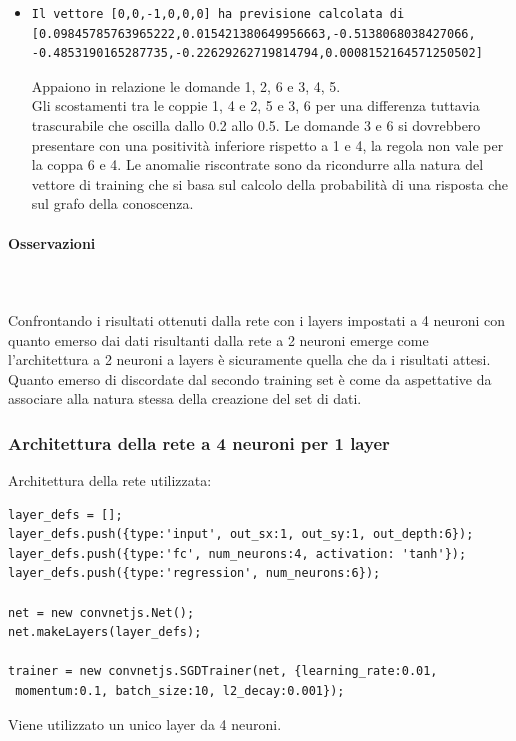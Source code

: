 \begin{itemize}
\item \begin{verbatim}Il vettore [0,0,-1,0,0,0] ha previsione calcolata di
[0.09845785763965222,0.015421380649956663,-0.5138068038427066,
-0.4853190165287735,-0.22629262719814794,0.0008152164571250502]
\end{verbatim}
Appaiono in relazione le domande 1, 2, 6 e 3, 4, 5.\\
Gli scostamenti tra le coppie 1, 4 e 2, 5 e 3, 6 per una differenza tuttavia trascurabile  che oscilla dallo 0.2 allo 0.5.
Le domande 3 e 6 si dovrebbero presentare con una positivit\`a inferiore rispetto a 1 e 4, la regola non vale per la coppa 6 e 4.
Le anomalie riscontrate sono da ricondurre alla natura del vettore di training che si basa sul calcolo della probabilit\`a di una risposta che sul grafo della conoscenza.
\end{itemize}


\paragraph{Osservazioni}\mbox{}
\label{Osservazioni su rete a 2 neuroni per ciascuno dei 2 layers}
\\\\
\noindent
Confrontando i risultati ottenuti dalla rete con i layers impostati a 4 neuroni con quanto emerso dai dati risultanti dalla  rete a 2 neuroni emerge come l'architettura  a 2 neuroni a layers \`e sicuramente quella che da i risultati attesi.\\
Quanto emerso di discordate dal secondo training set \`e come da aspettative da associare alla natura stessa della creazione del set di dati.


\subsubsection{Architettura della rete a 4 neuroni per 1 layer}
\label{Architettura della rete a 4 neuroni per 1 layer}

Architettura della rete utilizzata:\\
\begin{verbatim}layer_defs = [];
layer_defs.push({type:'input', out_sx:1, out_sy:1, out_depth:6});
layer_defs.push({type:'fc', num_neurons:4, activation: 'tanh'});
layer_defs.push({type:'regression', num_neurons:6});

net = new convnetjs.Net();
net.makeLayers(layer_defs);

trainer = new convnetjs.SGDTrainer(net, {learning_rate:0.01,
 momentum:0.1, batch_size:10, l2_decay:0.001});
\end{verbatim}
\noindent
Viene utilizzato un unico layer da 4 neuroni.

